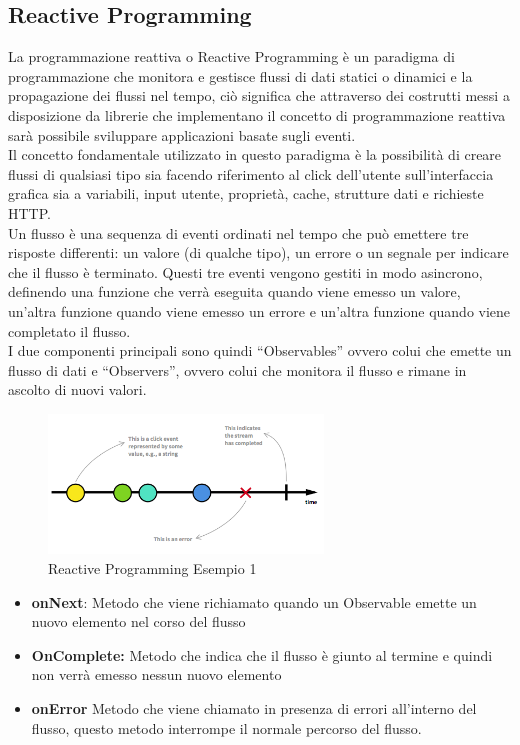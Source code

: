 \subsection{Reactive Programming}
La programmazione reattiva o Reactive Programming è un paradigma di programmazione che monitora e gestisce flussi di dati statici o dinamici e la propagazione dei flussi nel tempo, ciò significa che attraverso dei costrutti messi a disposizione da librerie che implementano il concetto di programmazione reattiva sarà possibile sviluppare applicazioni basate sugli eventi.\\
Il concetto fondamentale utilizzato in questo paradigma è la possibilità di creare flussi di qualsiasi tipo sia facendo riferimento al click dell'utente sull'interfaccia grafica sia a variabili, input utente, proprietà, cache, strutture dati e richieste HTTP.\\
Un flusso è una sequenza di eventi ordinati nel tempo che può emettere tre risposte differenti: un valore (di qualche tipo), un errore o un segnale per indicare che il flusso è terminato. Questi tre eventi vengono gestiti in modo asincrono, definendo una funzione che verrà eseguita quando viene emesso un valore, un'altra funzione quando viene emesso un errore e un'altra funzione quando viene completato il flusso.\\
I due componenti principali sono quindi ``Observables'' ovvero colui che emette un flusso di dati
e ``Observers'', ovvero colui che monitora il flusso e rimane in ascolto di nuovi valori.

\begin{figure}[!hb]
  \centering
  \includegraphics[width=0.65\textwidth]{immagini/reactive_programming_es1.png}
  \caption{Reactive Programming Esempio 1}\label{fig:Reactive Programming Esempio 1}
\end{figure}

\newpage
\begin{itemize}
  \item \textbf{onNext}: Metodo che viene richiamato quando un Observable emette  un  nuovo elemento nel corso del flusso
  \item  \textbf{OnComplete:} Metodo che indica che il flusso è giunto al termine e quindi non verrà emesso nessun nuovo elemento
  \item \textbf{onError} Metodo che viene chiamato in presenza di errori all'interno del flusso, questo metodo interrompe il normale percorso del flusso.
\end{itemize}

